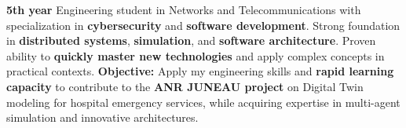 
\begin{cvparagraph}

    \textbf{5th year} Engineering student in Networks and Telecommunications with specialization in \textbf{cybersecurity} and \textbf{software development}. Strong foundation in \textbf{distributed systems}, \textbf{simulation}, and \textbf{software architecture}. Proven ability to \textbf{quickly master new technologies} and apply complex concepts in practical contexts.
    \newline
    \textbf{Objective:} Apply my engineering skills and \textbf{rapid learning capacity} to contribute to the \textbf{ANR JUNEAU project} on Digital Twin modeling for hospital emergency services, while acquiring expertise in multi-agent simulation and innovative architectures.

\end{cvparagraph}
